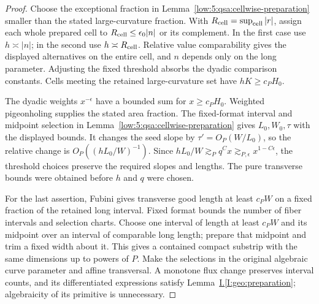 \documentclass[11pt]{amsart}
\theoremstyle{definition}
\theoremstyle{remark}
\numberwithin{equation}{section}
\newcommand{\partIref}[1]{\hyperref[I:#1]{I.\ref*{I:#1}}}
\begin{document}
\begin{proof}
Choose the exceptional fraction in Lemma~\ref{low:5:qsa:cellwise-preparation} smaller than the stated large-curvature fraction. With $R_{\rm cell}=\sup_{\rm cell}|r|$, assign each whole prepared cell to $R_{\rm cell}\le\epsilon_0|n|$ or its complement. In the first case use $h\asymp|n|$; in the second use $h\asymp R_{\rm cell}$. Relative value comparability gives the displayed alternatives on the entire cell, and $n$ depends only on the long parameter. Adjusting the fixed threshold absorbs the dyadic comparison constants. Cells meeting the retained large-curvature set have $hK\ge c_PH_0$.

The dyadic weights $x^{-\epsilon}$ have a bounded sum for $x\ge c_PH_0$. Weighted pigeonholing supplies the stated area fraction. The fixed-format interval and midpoint selection in Lemma~\ref{low:5:qsa:cellwise-preparation} gives $L_0,W_0,\tau$ with the displayed bounds. It changes the seed slope by $\tau'=O_P(W/L_0)$, so the relative change is $O_P((hL_0/W)^{-1})$. Since $hL_0/W\gtrsim_Pq^Cx\gtrsim_{P,\epsilon}x^{1-C\epsilon}$, the threshold choices preserve the required slopes and lengths. The pure transverse bounds were obtained before $h$ and $q$ were chosen.

For the last assertion, Fubini gives transverse good length at least $c_PW$ on a fixed fraction of the retained long interval. Fixed format bounds the number of fiber intervals and selection charts. Choose one interval of length at least $c_PW$ and its midpoint over an interval of comparable long length; prepare that midpoint and trim a fixed width about it. This gives a contained compact substrip with the same dimensions up to powers of $P$. Make the selections in the original algebraic curve parameter and affine transversal. A monotone flux change preserves interval counts, and its differentiated expressions satisfy Lemma~\partIref{geo:preparation}; algebraicity of its primitive is unnecessary.
\end{proof}
\end{document}
